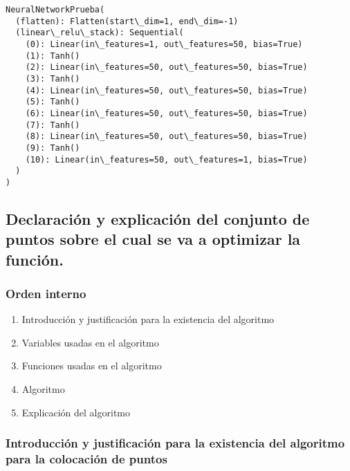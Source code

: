 \documentclass[11pt]{article}
\makeatletter
\providecommand{\tightlist}{%
      \setlength{\itemsep}{0pt}\setlength{\parskip}{0pt}}
\newcommand{\boxspacing}{\kern\kvtcb@left@rule\kern\kvtcb@boxsep}
\newcommand{\prompt}[4]{
        {\ttfamily\llap{{\color{#2}[#3]:\hspace{3pt}#4}}\vspace{-\baselineskip}}
    }
\makeatother
\begin{document}
            \begin{tcolorbox}[breakable, size=fbox, boxrule=.5pt, pad at break*=1mm, opacityfill=0]
\prompt{Out}{outcolor}{2}{\boxspacing}
\begin{Verbatim}[commandchars=\\\{\}]
NeuralNetworkPrueba(
  (flatten): Flatten(start\_dim=1, end\_dim=-1)
  (linear\_relu\_stack): Sequential(
    (0): Linear(in\_features=1, out\_features=50, bias=True)
    (1): Tanh()
    (2): Linear(in\_features=50, out\_features=50, bias=True)
    (3): Tanh()
    (4): Linear(in\_features=50, out\_features=50, bias=True)
    (5): Tanh()
    (6): Linear(in\_features=50, out\_features=50, bias=True)
    (7): Tanh()
    (8): Linear(in\_features=50, out\_features=50, bias=True)
    (9): Tanh()
    (10): Linear(in\_features=50, out\_features=1, bias=True)
  )
)
\end{Verbatim}
\end{tcolorbox}
        
    \hypertarget{declaraciuxf3n-y-explicaciuxf3n-del-conjunto-de-puntos-sobre-el-cual-se-va-a-optimizar-la-funciuxf3n.}{%
\subsection{Declaración y explicación del conjunto de puntos sobre el
cual se va a optimizar la
función.}\label{declaraciuxf3n-y-explicaciuxf3n-del-conjunto-de-puntos-sobre-el-cual-se-va-a-optimizar-la-funciuxf3n.}}

\hypertarget{orden-interno}{%
\subsubsection{Orden interno}\label{orden-interno}}

\begin{enumerate}
\def\labelenumi{\arabic{enumi}.}
\tightlist
\item
  Introducción y justificación para la existencia del algoritmo
\item
  Variables usadas en el algoritmo
\item
  Funciones usadas en el algoritmo
\item
  Algoritmo
\item
  Explicación del algoritmo
\end{enumerate}

\hypertarget{introducciuxf3n-y-justificaciuxf3n-para-la-existencia-del-algoritmo-para-la-colocaciuxf3n-de-puntos}{%
\subsubsection{Introducción y justificación para la existencia del
algoritmo para la colocación de
puntos}\label{introducciuxf3n-y-justificaciuxf3n-para-la-existencia-del-algoritmo-para-la-colocaciuxf3n-de-puntos}}
\end{document}
